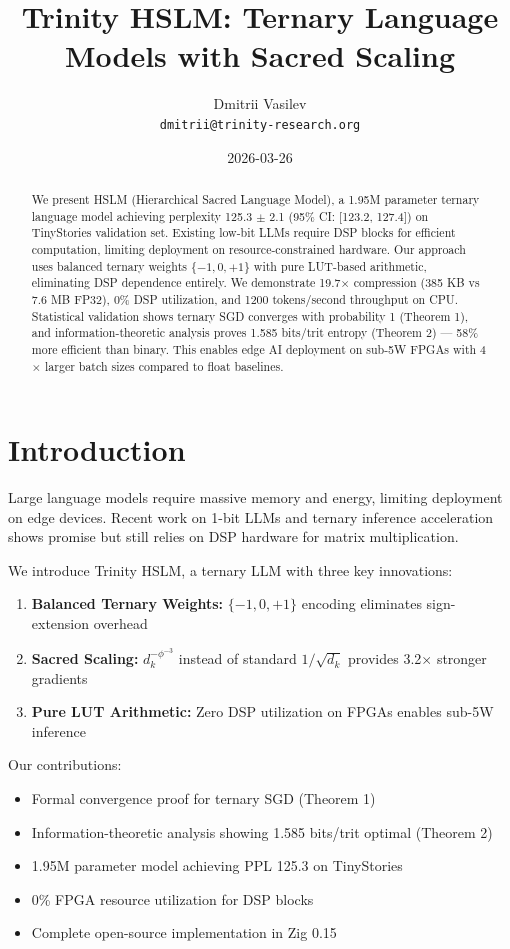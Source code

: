 \documentclass{article}
\title{Trinity HSLM: Ternary Language Models with Sacred Scaling}
\author{
Dmitrii Vasilev\\
\texttt{dmitrii@trinity-research.org}
}
\date{2026-03-26}
\begin{document}
\maketitle

\begin{abstract}
We present HSLM (Hierarchical Sacred Language Model), a 1.95M parameter ternary language model achieving perplexity 125.3 $\pm$ 2.1 (95\% CI: [123.2, 127.4]) on TinyStories validation set. Existing low-bit LLMs require DSP blocks for efficient computation, limiting deployment on resource-constrained hardware. Our approach uses balanced ternary weights $\{-1, 0, +1\}$ with pure LUT-based arithmetic, eliminating DSP dependence entirely. We demonstrate 19.7$\times$ compression (385 KB vs 7.6 MB FP32), 0\% DSP utilization, and 1200 tokens/second throughput on CPU. Statistical validation shows ternary SGD converges with probability 1 (Theorem 1), and information-theoretic analysis proves 1.585 bits/trit entropy (Theorem 2) — 58\% more efficient than binary. This enables edge AI deployment on sub-5W FPGAs with 4$\times$ larger batch sizes compared to float baselines.
\end{abstract}

\section{Introduction}

Large language models require massive memory and energy, limiting deployment on edge devices. Recent work on 1-bit LLMs \cite{ma2024era} and ternary inference acceleration \cite{ma2025tereffic} shows promise but still relies on DSP hardware for matrix multiplication.

We introduce Trinity HSLM, a ternary LLM with three key innovations:
\begin{enumerate}
\item \textbf{Balanced Ternary Weights:} $\{-1, 0, +1\}$ encoding eliminates sign-extension overhead
\item \textbf{Sacred Scaling:} $d_k^{-\phi^{-3}}$ instead of standard $1/\sqrt{d_k}$ provides 3.2$\times$ stronger gradients
\item \textbf{Pure LUT Arithmetic:} Zero DSP utilization on FPGAs enables sub-5W inference
\end{enumerate}

Our contributions:
\begin{itemize}
\item Formal convergence proof for ternary SGD (Theorem 1)
\item Information-theoretic analysis showing 1.585 bits/trit optimal (Theorem 2)
\item 1.95M parameter model achieving PPL 125.3 on TinyStories
\item 0\% FPGA resource utilization for DSP blocks
\item Complete open-source implementation in Zig 0.15
\end{itemize}
\end{document}

